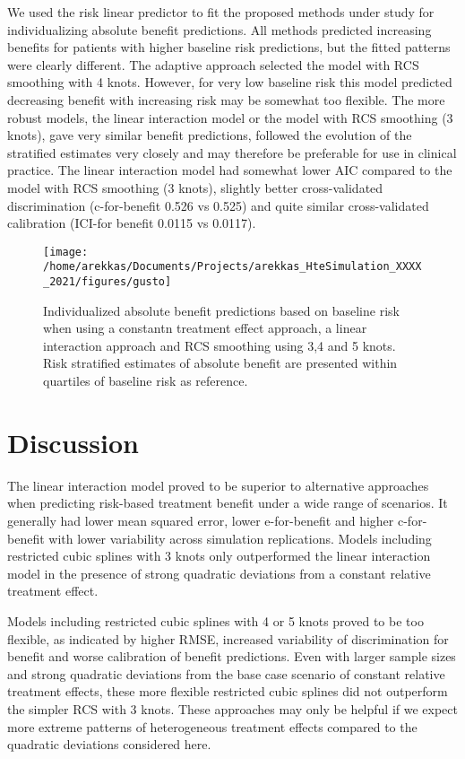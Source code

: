 \documentclass{article}
\begin{document}
We used the risk linear predictor to fit the proposed methods under
study for individualizing absolute benefit predictions. All methods
predicted increasing benefits for patients with higher baseline risk
predictions, but the fitted patterns were clearly different. The
adaptive approach selected the model with RCS smoothing with 4 knots.
However, for very low baseline risk this model predicted decreasing
benefit with increasing risk may be somewhat too flexible. The more
robust models, the linear interaction model or the model with RCS
smoothing (3 knots), gave very similar benefit predictions, followed the
evolution of the stratified estimates very closely and may therefore be
preferable for use in clinical practice. The linear interaction model
had somewhat lower AIC compared to the model with RCS smoothing (3
knots), slightly better cross-validated discrimination (c-for-benefit
0.526 vs 0.525) and quite similar cross-validated calibration (ICI-for
benefit 0.0115 vs 0.0117).

\begin{figure}
\texttt{[image: /home/arekkas/Documents/Projects/arekkas\_HteSimulation\_XXXX\_2021/figures/gusto]} \caption{Individualized absolute benefit predictions based on baseline risk when using a constantn treatment effect approach, a linear interaction approach and RCS smoothing using 3,4 and 5 knots. Risk stratified estimates of absolute benefit are presented within quartiles of baseline risk as reference.}\label{fig:gusto}
\end{figure}

\hypertarget{discussion}{%
\section{Discussion}\label{discussion}}

The linear interaction model proved to be superior to alternative
approaches when predicting risk-based treatment benefit under a wide
range of scenarios. It generally had lower mean squared error, lower
e-for-benefit and higher c-for-benefit with lower variability across
simulation replications. Models including restricted cubic splines with
3 knots only outperformed the linear interaction model in the presence
of strong quadratic deviations from a constant relative treatment
effect.

Models including restricted cubic splines with 4 or 5 knots proved to be
too flexible, as indicated by higher RMSE, increased variability of
discrimination for benefit and worse calibration of benefit predictions.
Even with larger sample sizes and strong quadratic deviations from the
base case scenario of constant relative treatment effects, these more
flexible restricted cubic splines did not outperform the simpler RCS
with 3 knots. These approaches may only be helpful if we expect more
extreme patterns of heterogeneous treatment effects compared to the
quadratic deviations considered here.
\end{document}
